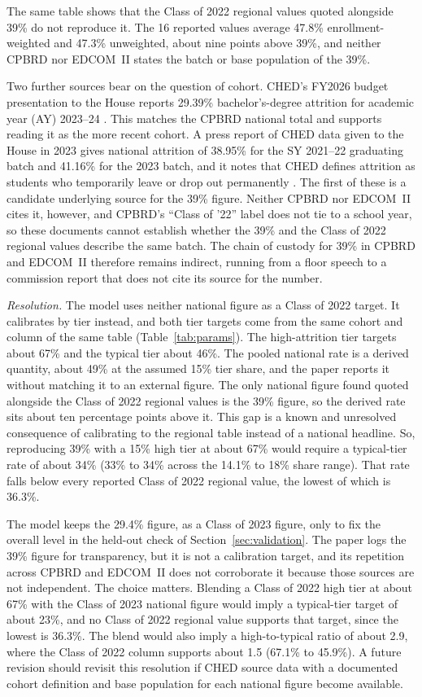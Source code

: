 \documentclass[11pt]{article}
\begin{document}
The same table shows that the Class of 2022 regional values quoted alongside 39\% do not reproduce it. The 16 reported values average 47.8\% enrollment-weighted and 47.3\% unweighted, about nine points above 39\%, and neither CPBRD nor EDCOM~II states the batch or base population of the 39\%.

Two further sources bear on the question of cohort. CHED's FY2026 budget presentation to the House reports 29.39\% bachelor's-degree attrition for academic year (AY) 2023--24 \citep{ched2025presentation}. This matches the CPBRD national total and supports reading it as the more recent cohort. A press report of CHED data given to the House in 2023 gives national attrition of 38.95\% for the SY 2021--22 graduating batch and 41.16\% for the 2023 batch, and it notes that CHED defines attrition as students who temporarily leave or drop out permanently \citep{chi2023pandemic}. The first of these is a candidate underlying source for the 39\% figure. Neither CPBRD nor EDCOM~II cites it, however, and CPBRD's ``Class of '22'' label does not tie to a school year, so these documents cannot establish whether the 39\% and the Class of 2022 regional values describe the same batch. The chain of custody for 39\% in CPBRD and EDCOM~II therefore remains indirect, running from a floor speech to a commission report that does not cite its source for the number.

\emph{Resolution.} The model uses neither national figure as a Class of 2022 target. It calibrates by tier instead, and both tier targets come from the same cohort and column of the same table (Table~\ref{tab:params}). The high-attrition tier targets about 67\% and the typical tier about 46\%. The pooled national rate is a derived quantity, about 49\% at the assumed 15\% tier share, and the paper reports it without matching it to an external figure. The only national figure found quoted alongside the Class of 2022 regional values is the 39\% figure, so the derived rate sits about ten percentage points above it. This gap is a known and unresolved consequence of calibrating to the regional table instead of a national headline. So, reproducing 39\% with a 15\% high tier at about 67\% would require a typical-tier rate of about 34\% (33\% to 34\% across the 14.1\% to 18\% share range). That rate falls below every reported Class of 2022 regional value, the lowest of which is 36.3\%.

The model keeps the 29.4\% figure, as a Class of 2023 figure, only to fix the overall level in the held-out check of Section~\ref{sec:validation}. The paper logs the 39\% figure for transparency, but it is not a calibration target, and its repetition across CPBRD and EDCOM~II does not corroborate it because those sources are not independent. The choice matters. Blending a Class of 2022 high tier at about 67\% with the Class of 2023 national figure would imply a typical-tier target of about 23\%, and no Class of 2022 regional value supports that target, since the lowest is 36.3\%. The blend would also imply a high-to-typical ratio of about 2.9, where the Class of 2022 column supports about 1.5 (67.1\% to 45.9\%). A future revision should revisit this resolution if CHED source data with a documented cohort definition and base population for each national figure become available.
\end{document}

